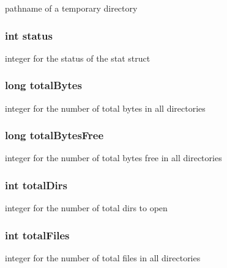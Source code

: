 pathname of a temporary directory 
\subsubsection{\setlength{\rightskip}{0pt plus 5cm}int {\bf status}}\label{dir_8c_6e27f49150e9a14580fb313cc2777e00}


integer for the status of the stat struct 
\subsubsection{\setlength{\rightskip}{0pt plus 5cm}long {\bf total\-Bytes}}\label{dir_8c_1f2d4bead755d142efaa0382f5f9ecbe}


integer for the number of total bytes in all directories 
\subsubsection{\setlength{\rightskip}{0pt plus 5cm}long {\bf total\-Bytes\-Free}}\label{dir_8c_09f1e3f8488dd4ef7ec5394d86d3e205}


integer for the number of total bytes free in all directories 
\subsubsection{\setlength{\rightskip}{0pt plus 5cm}int {\bf total\-Dirs}}\label{dir_8c_24d5c035dc8085a73e30b0ec9317f3e8}


integer for the number of total dirs to open 
\subsubsection{\setlength{\rightskip}{0pt plus 5cm}int {\bf total\-Files}}\label{dir_8c_4802117084c7fa03548df0b43d21cafb}


integer for the number of total files in all directories 